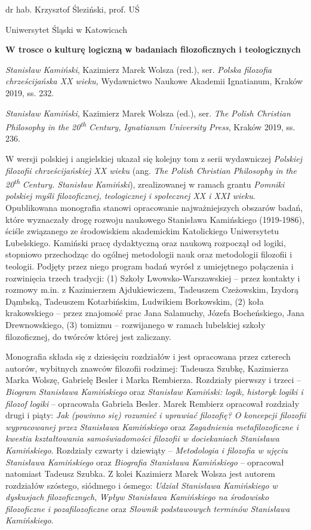 \documentclass[a4paper]{article}
\title{}
\begin{document}
dr hab. Krzysztof Śleziński, prof. UŚ  

Uniwersytet Śląski w Katowicach

{\centering
\textbf{W trosce o kulturę logiczną w badaniach filozoficznych i teologicznych}
\par}

\textit{Stanisław Kamiński}, Kazimierz Marek Wolsza (red.), ser. \textit{Polska filozofia chrześcijańska XX wieku,
}Wydawnictwo Naukowe Akademii Ignatianum, Kraków 2019, ss. 232.

\textit{Stanisław Kamiński}, Kazimierz Marek Wolsza (ed.), ser. \textit{The Polish Christian Philosophy in the
20}\textit{\textsuperscript{th}}\textit{ Century, Ignatianum University Press}, Kraków 2019, ss. 236.

W wersji polskiej i angielskiej ukazał się kolejny tom z serii wydawniczej \textit{Polskiej filozofii chrześcijańskiej
XX wieku }(ang. \textit{The Polish Christian Philosophy in the 20}\textit{\textsuperscript{th}}\textit{ Century.
Stanisław Kamiński}), zrealizowanej w ramach grantu \textit{Pomniki polskiej myśli filozoficznej, teologicznej i
społecznej XX i XXI wieku}. Opublikowana monografia stanowi opracowanie najważniejszych obszarów badań, które
wyznaczały drogę rozwoju naukowego Stanisława Kamińskiego (1919-1986), ściśle związanego ze środowiskiem akademickim
Katolickiego Uniwersytetu Lubelskiego. Kamiński pracę dydaktyczną oraz naukową rozpoczął od logiki, stopniowo
przechodząc do ogólnej metodologii nauk oraz metodologii filozofii i teologii. Podjęty przez niego program badań wyrósł
z umiejętnego połączenia i rozwinięcia trzech tradycji: (1) Szkoły Lwowsko-Warszawskiej – przez kontakty i rozmowy
m.in. z Kazimierzem Ajdukiewiczem, Tadeuszem Czeżowskim, Izydorą Dąmbską, Tadeuszem Kotarbińskim, Ludwikiem Borkowskim,
(2) koła krakowskiego – przez znajomość prac Jana Salamuchy, Józefa Bocheńskiego, Jana Drewnowskiego, (3) tomizmu – 
rozwijanego w ramach lubelskiej szkoły filozoficznej, do twórców której jest zaliczany.

Monografia składa się z dziesięciu rozdziałów i jest opracowana przez czterech autorów, wybitnych znawców filozofii
rodzimej: Tadeusza Szubkę, Kazimierza Marka Wolszę, Gabrielę Besler i Marka Rembierza. Rozdziały pierwszy i trzeci –
\textit{Biogram Stanisława Kamińskiego} oraz \textit{Stanisław Kamiński: logik, historyk logiki i filozof  logiki} –
opracowała Gabriela Besler. Marek Rembierz opracował rozdziały drugi i piąty:  \textit{Jak (powinno się) rozumieć i
uprawiać filozofię? O koncepcji filozofii }\textit{wypracowanej przez Stanisława Kamińskiego} oraz \textit{Zagadnienia
metafilozoficzne i kwestia kształtowania samoświadomości filozofii w dociekaniach Stanisława Kamińskiego}. Rozdziały
czwarty i dziewiąty – \textit{Metodologia i filozofia w ujęciu Stanisława Kamińskiego} oraz  \textit{Biografia
Stanisława Kamińskiego} – opracował natomiast Tadeusz Szubka. Z kolei Kazimierz Marek Wolsza jest autorem rozdziałów
szóstego, siódmego i ósmego: \textit{Udział Stanisława Kamińskiego w dyskusjach filozoficznych}, \textit{Wpływ
Stanisława Kamińskiego na środowisko filozoficzne i pozafilozoficzne} oraz \textit{Słownik podstawowych terminów
Stanisława Kamińskiego}. 
\end{document}
